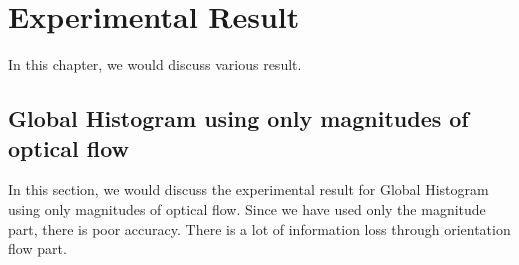 \chapter{Experimental Result} %

\label{Chapter 6} 

In this chapter, we would discuss various result.

\section{Global Histogram using only magnitudes of optical flow}
In this section, we would discuss the experimental result for Global Histogram using only magnitudes of optical flow. Since we have used only the magnitude part, there is poor accuracy.
There is a lot of information loss through orientation flow part.


